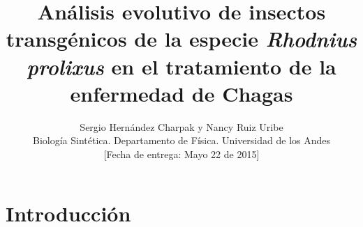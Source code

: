 \documentclass[12pt]{article}
\numberwithin{equation}{section}
\begin{document}
\title{Análisis evolutivo de insectos transgénicos de la especie \textit{Rhodnius prolixus} en el tratamiento de la enfermedad de Chagas}
\author{ {\sc Sergio Hernández Charpak y Nancy Ruiz Uribe}\\[2pt]
Biología Sintética. Departamento de Física. Universidad de los Andes \\[6pt]
{\rm [Fecha de entrega: Mayo 22 de 2015]}\vspace*{6pt}}
\maketitle





\section{Introducción}
\end{document}
